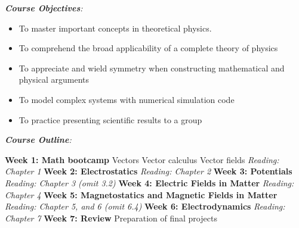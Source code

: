 \documentclass[10pt]{article}
\begin{document}
\textit{\textbf{Course Objectives}:}
\begin{itemize}
\item To master important concepts in theoretical physics.
\item To comprehend the broad applicability of a complete theory of physics
\item To appreciate and wield symmetry when constructing mathematical and physical arguments
\item To model complex systems with numerical simulation code
\item To practice presenting scientific results to a group
\end{itemize}
\textit{\textbf{Course Outline}:}
\begin{outline}[enumerate]
\1 \textbf{Week 1: Math bootcamp}
\2 Vectors
\2 Vector calculus
\2 Vector fields
\2 \textit{Reading: Chapter 1}
\1 \textbf{Week 2: Electrostatics}
\2 \textit{Reading: Chapter 2}
\1 \textbf{Week 3: Potentials}
\2 \textit{Reading: Chapter 3 (omit 3.2)}
\1 \textbf{Week 4: Electric Fields in Matter}
\2 \textit{Reading: Chapter 4}
\1 \textbf{Week 5: Magnetostatics and Magnetic Fields in Matter}
\2 \textit{Reading: Chapter 5, and 6 (omit 6.4)}
\1 \textbf{Week 6: Electrodynamics}
\2 \textit{Reading: Chapter 7}
\1 \textbf{Week 7: Review}
\2 Preparation of final projects
\end{outline}
\end{document}
